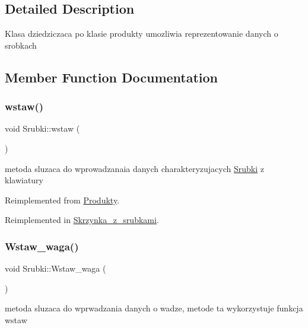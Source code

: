 \subsection{Detailed Description}
Klasa dziedziczaca po klasie produkty umozliwia reprezentowanie danych o srobkach 

\subsection{Member Function Documentation}
\mbox{\label{class_srubki_a129b7fcf23ad1928f196ca255aa66438}} 
\subsubsection{\texorpdfstring{wstaw()}{wstaw()}}
{\footnotesize\ttfamily void Srubki\+::wstaw (\begin{DoxyParamCaption}{ }\end{DoxyParamCaption})\hspace{0.3cm}{\ttfamily [virtual]}}

metoda sluzaca do wprowadzanaia danych charakteryzujacych \mbox{\hyperlink{class_srubki}{Srubki}} z klawiatury 

Reimplemented from \mbox{\hyperlink{class_produkty_ad69fa64c8984c55fe9b1a2ade607a0ed}{Produkty}}.



Reimplemented in \mbox{\hyperlink{class_skrzynka__z__srubkami_a4726c1844080cb96e833cf16e977ecb3}{Skrzynka\+\_\+z\+\_\+srubkami}}.

\mbox{\label{class_srubki_a24162b0853a08261b4a48e9821a22478}} 
\subsubsection{\texorpdfstring{Wstaw\+\_\+waga()}{Wstaw\_waga()}}
{\footnotesize\ttfamily void Srubki\+::\+Wstaw\+\_\+waga (\begin{DoxyParamCaption}{ }\end{DoxyParamCaption})}

metoda sluzaca do wprwadzania danych o wadze, metode ta wykorzystuje funkcja wstaw \mbox{\label{class_srubki_a0ac1f1ce5748283a13b0f554add73f0b}} 
